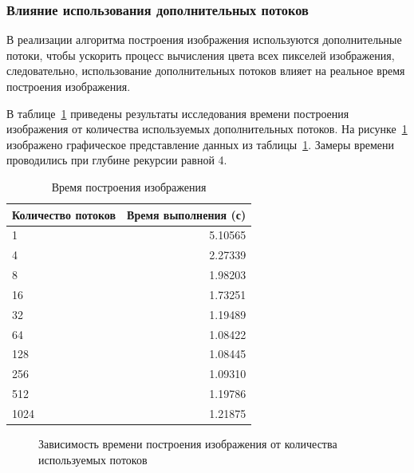 \subsubsection*{Влияние использования дополнительных потоков}

В реализации алгоритма построения изображения используются дополнительные потоки, чтобы ускорить процесс вычисления цвета всех пикселей изображения, следовательно, использование дополнительных потоков влияет на реальное время построения изображения.

В таблице~\ref{th} приведены результаты исследования времени построения изображения от количества используемых дополнительных потоков. На рисунке~\ref{gth} изображено графическое представление данных из таблицы~\ref{th}. Замеры времени проводились при глубине рекурсии равной 4.

\begin{table}[ht!]
	\begin{center}
		\caption{Время построения изображения}
		\begin{tabular}{ ||p{4.5cm}|r||  }
			\hline
			\multirow{1}{*}{Количество потоков}& \multicolumn{1}{c||}{Время выполнения (с)} \\[1.5ex]
			\hline\hline
			1 & 	  5.10565 \\
			4  &     2.27339\\
			8 &  	 1.98203 \\
			16 &    1.73251 \\
			32 &    1.19489 \\
			64 &    1.08422 \\
			128 &   1.08445 \\
			256 &  1.09310 \\
			512 &   1.19786 \\
			1024 & 1.21875 \\
			\hline
		\end{tabular}
		\label{th}
	\end{center}
\end{table}

\begin{figure}[ht!]
	\begin{center}
	\end{center}
	\caption{Зависимость времени построения изображения от количества используемых потоков}
	\label{gth}
\end{figure}


